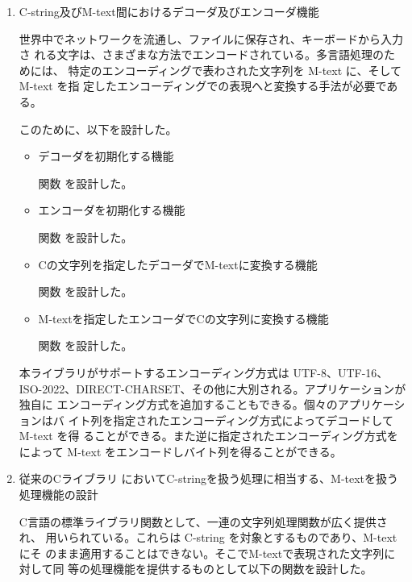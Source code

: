 \begin{enumerate}
\item C-string及びM-text間におけるデコーダ及びエンコーダ機能

世界中でネットワークを流通し、ファイルに保存され、キーボードから入力さ
れる文字は、さまざまな方法でエンコードされている。多言語処理のためには、
特定のエンコーディングで表わされた文字列を M-text に、そして M-text を指
定したエンコーディングでの表現へと変換する手法が必要である。

このために、以下を設計した。

     \begin{itemize}
     \item デコーダを初期化する機能\par 
	関数 を設計した。
      \item エンコーダを初期化する機能\par 
	関数 を設計した。
      \item Cの文字列を指定したデコーダでM-textに変換する機能\par 
	関数 を設計した。
      \item M-textを指定したエンコーダでCの文字列に変換する機能\par 
	関数 を設計した。
     \end{itemize}
     
本ライブラリがサポートするエンコーディング方式は UTF-8、UTF-16、
ISO-2022、DIRECT-CHARSET、その他に大別される。アプリケーションが独自に 
エンコーディング方式を追加することもできる。個々のアプリケーションはバ
イト列を指定されたエンコーディング方式によってデコードしてM-text を得
ることができる。また逆に指定されたエンコーディング方式をによって 
M-text をエンコードしバイト列を得ることができる。

\item 従来のCライブラリ においてC-stringを扱う処理に相当する、M-textを扱う処理機能の設計

C言語の標準ライブラリ関数として、一連の文字列処理関数が広く提供され、
用いられている。これらは C-string を対象とするものであり、M-text にそ
のまま適用することはできない。そこでM-textで表現された文字列に対して同
等の処理機能を提供するものとして以下の関数を設計した。


\end{enumerate}
